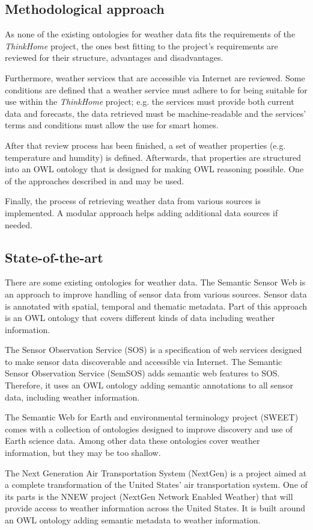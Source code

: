 \documentclass{scrartcl}
\begin{document}
\subsection*{Methodological approach}
As none of the existing ontologies for weather data fits the requirements of the \textit{ThinkHome} project, the ones best fitting to the project's requirements are reviewed for their structure, advantages and disadvantages.

Furthermore, weather services that are accessible via Internet are reviewed. Some conditions are defined that a weather service must adhere to for being suitable for use within the \textit{ThinkHome} project; e.g. the services must provide both current data and forecasts, the data retrieved must be machine-readable and the services' terms and conditions must allow the use for smart homes.

After that review process has been finished, a set of weather properties (e.g. temperature and humdity) is defined. Afterwards, that properties are structured into an OWL ontology that is designed for making OWL reasoning possible. One of the approaches described in \cite{Ontology101} and \cite{SoftwareEngineeringOntology} may be used.

Finally, the process of retrieving weather data from various sources is implemented. A modular approach helps adding additional data sources if needed.

\subsection*{State-of-the-art}

There are some existing ontologies for weather data. The Semantic Sensor Web \cite{SemanticSensorWeb} is an approach to improve handling of sensor data from various sources. Sensor data is annotated with spatial, temporal and thematic metadata. Part of this approach is an OWL ontology that covers different kinds of data including weather information.

The Sensor Observation Service (SOS) \cite{SOS} is a specification of web services designed to make sensor data discoverable and accessible via Internet. The Semantic Sensor Observation Service (SemSOS) \cite{SemSOS} adds semantic web features to SOS. Therefore, it uses an OWL ontology adding semantic annotations to all sensor data, including weather information.

The Semantic Web for Earth and environmental terminology project (SWEET) \cite{SWEET} comes with a collection of ontologies designed to improve discovery and use of Earth science data. Among other data these ontologies cover weather information, but they may be too shallow.

The Next Generation Air Transportation System (NextGen) \cite{NextGen} is a project aimed at a complete transformation of the United States' air transportation system. One of its parts is the NNEW project (NextGen Network Enabled Weather) that will provide access to weather information across the United States. It is built around an OWL ontology adding semantic metadata to weather information.



\end{document}
